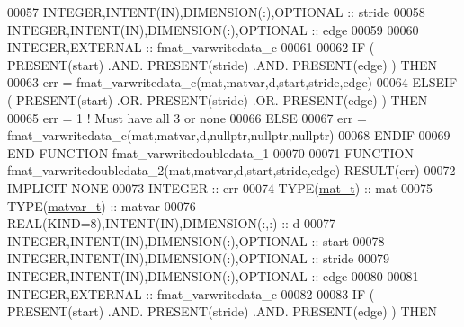 \begin{DoxyCode}
00057     \textcolor{keywordtype}{INTEGER},\textcolor{keywordtype}{INTENT(IN)},\textcolor{keywordtype}{DIMENSION(:)},\textcolor{keywordtype}{OPTIONAL} :: stride
00058     \textcolor{keywordtype}{INTEGER},\textcolor{keywordtype}{INTENT(IN)},\textcolor{keywordtype}{DIMENSION(:)},\textcolor{keywordtype}{OPTIONAL} :: edge
00059 
00060     \textcolor{keywordtype}{INTEGER},\textcolor{keywordtype}{EXTERNAL}                         :: fmat\_varwritedata\_c
00061 
00062     \textcolor{keywordflow}{IF} ( \textcolor{keyword}{PRESENT}(start) .AND. \textcolor{keyword}{PRESENT}(stride) .AND. \textcolor{keyword}{PRESENT}(edge) ) \textcolor{keywordflow}{THEN}
00063         err = fmat\_varwritedata\_c(mat,matvar,d,start,stride,edge)
00064     \textcolor{keywordflow}{ELSEIF} ( \textcolor{keyword}{PRESENT}(start) .OR. \textcolor{keyword}{PRESENT}(stride) .OR. \textcolor{keyword}{PRESENT}(edge) ) \textcolor{keywordflow}{THEN}
00065         err = 1    \textcolor{comment}{! Must have all 3 or none}
00066     \textcolor{keywordflow}{ELSE}
00067         err = fmat\_varwritedata\_c(mat,matvar,d,nullptr,nullptr,nullptr)
00068 \textcolor{keywordflow}{    ENDIF}
00069 \textcolor{keyword}{END FUNCTION }fmat\_varwritedoubledata\_1
00070 
00071 \textcolor{keyword}{FUNCTION }fmat\_varwritedoubledata\_2(mat,matvar,d,start,stride,edge) \textcolor{keyword}{RESULT}(err)
00072 \textcolor{keywordtype}{IMPLICIT NONE}
00073     \textcolor{keywordtype}{INTEGER}                                  :: err
00074     \textcolor{keywordtype}{TYPE}(\hyperlink{group___m_a_t_gab0fc888f5a5d79943b16284b1f91c2e8}{mat\_t})                              :: mat
00075     \textcolor{keywordtype}{TYPE}(\hyperlink{group___m_a_t_structmatvar__t}{matvar\_t})                           :: matvar
00076     \textcolor{keywordtype}{REAL(KIND=8)},\textcolor{keywordtype}{INTENT(IN)},\textcolor{keywordtype}{DIMENSION(:,:)}   :: d
00077     \textcolor{keywordtype}{INTEGER},\textcolor{keywordtype}{INTENT(IN)},\textcolor{keywordtype}{DIMENSION(:)},\textcolor{keywordtype}{OPTIONAL} :: start
00078     \textcolor{keywordtype}{INTEGER},\textcolor{keywordtype}{INTENT(IN)},\textcolor{keywordtype}{DIMENSION(:)},\textcolor{keywordtype}{OPTIONAL} :: stride
00079     \textcolor{keywordtype}{INTEGER},\textcolor{keywordtype}{INTENT(IN)},\textcolor{keywordtype}{DIMENSION(:)},\textcolor{keywordtype}{OPTIONAL} :: edge
00080 
00081     \textcolor{keywordtype}{INTEGER},\textcolor{keywordtype}{EXTERNAL}                         :: fmat\_varwritedata\_c
00082 
00083     \textcolor{keywordflow}{IF} ( \textcolor{keyword}{PRESENT}(start) .AND. \textcolor{keyword}{PRESENT}(stride) .AND. \textcolor{keyword}{PRESENT}(edge) ) \textcolor{keywordflow}{THEN}

\end{DoxyCode}
